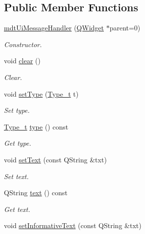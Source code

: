 \subsection*{Public Member Functions}
\begin{DoxyCompactItemize}
\item 
\hyperlink{classmdt_ui_message_handler_a3a109bea3e55111ea190ba0ba9d58b59}{mdt\-Ui\-Message\-Handler} (\hyperlink{class_q_widget}{Q\-Widget} $\ast$parent=0)
\begin{DoxyCompactList}\small\item\em Constructor. \end{DoxyCompactList}\item 
void \hyperlink{classmdt_ui_message_handler_a41ecc9d8079ea8340b4fb2dc80da9604}{clear} ()
\begin{DoxyCompactList}\small\item\em Clear. \end{DoxyCompactList}\item 
void \hyperlink{classmdt_ui_message_handler_ae0ee3bb540906bb92ef5105ca41fb434}{set\-Type} (\hyperlink{classmdt_ui_message_handler_a115062a2ab56f3d7386d35e34f075fcf}{Type\-\_\-t} t)
\begin{DoxyCompactList}\small\item\em Set type. \end{DoxyCompactList}\item 
\hyperlink{classmdt_ui_message_handler_a115062a2ab56f3d7386d35e34f075fcf}{Type\-\_\-t} \hyperlink{classmdt_ui_message_handler_a6a44af54b51b07637c99eb52c896b26c}{type} () const 
\begin{DoxyCompactList}\small\item\em Get type. \end{DoxyCompactList}\item 
void \hyperlink{classmdt_ui_message_handler_a447074f92c6ba2cbce9be3b38e854453}{set\-Text} (const Q\-String \&txt)
\begin{DoxyCompactList}\small\item\em Set text. \end{DoxyCompactList}\item 
Q\-String \hyperlink{classmdt_ui_message_handler_af5d74ce8cad4aaca07cfb5aafcdf3e67}{text} () const 
\begin{DoxyCompactList}\small\item\em Get text. \end{DoxyCompactList}\item 
void \hyperlink{classmdt_ui_message_handler_a413bdb23600f102d56bcd554fb092b2f}{set\-Informative\-Text} (const Q\-String \&txt)

\end{DoxyCompactItemize}
